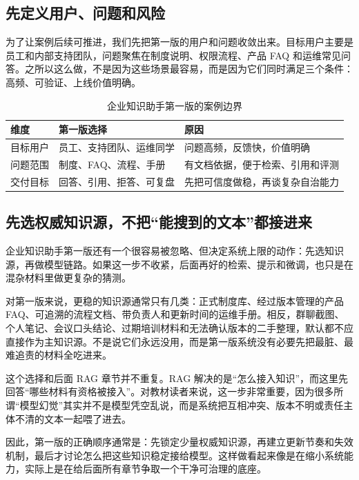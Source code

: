 \subsection{先定义用户、问题和风险}
为了让案例后续可推进，我们先把第一版的用户和问题收敛出来。目标用户主要是员工和内部支持团队，问题聚焦在制度说明、权限流程、产品 FAQ 和运维常见问答。之所以这么做，不是因为这些场景最容易，而是因为它们同时满足三个条件：高频、可验证、上线价值明确。

\begin{table}[H]
\centering
\small
\begin{tabularx}{\textwidth}{>{\raggedright\arraybackslash}p{2.8cm}>{\raggedright\arraybackslash}p{3.2cm}>{\raggedright\arraybackslash}X}
\toprule
\textbf{维度} & \textbf{第一版选择} & \textbf{原因} \\
\midrule
目标用户 & 员工、支持团队、运维同学 & 问题高频，反馈快，价值明确 \\
问题范围 & 制度、FAQ、流程、手册 & 有文档依据，便于检索、引用和评测 \\
交付目标 & 回答、引用、拒答、可复盘 & 先把可信度做稳，再谈复杂自治能力 \\
\bottomrule
\end{tabularx}
\caption{企业知识助手第一版的案例边界}
\label{tab:assistant-v1-scope}
\end{table}

\subsection{先选权威知识源，不把“能搜到的文本”都接进来}
企业知识助手第一版还有一个很容易被忽略、但决定系统上限的动作：先选知识源，再做模型链路。如果这一步不收紧，后面再好的检索、提示和微调，也只是在混杂材料里做更复杂的猜测。

对第一版来说，更稳的知识源通常只有几类：正式制度库、经过版本管理的产品 FAQ、可追溯的流程文档、带负责人和更新时间的运维手册。相反，群聊截图、个人笔记、会议口头结论、过期培训材料和无法确认版本的二手整理，默认都不应直接作为主知识源。不是说它们永远没用，而是第一版系统没有必要先把最脏、最难追责的材料全吃进来。

这个选择和后面 RAG 章节并不重复。RAG 解决的是“怎么接入知识”，而这里先回答“哪些材料有资格被接入”。对教材读者来说，这一步非常重要，因为很多所谓“模型幻觉”其实并不是模型凭空乱说，而是系统把互相冲突、版本不明或责任主体不清的文本一起喂了进去。

因此，第一版的正确顺序通常是：先锁定少量权威知识源，再建立更新节奏和失效机制，最后才讨论怎么把这些知识稳定接给模型。这样做看起来像是在缩小系统能力，实际上是在给后面所有章节争取一个干净可治理的底座。

